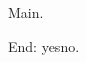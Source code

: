 \documentclass{article}
\begin{document}
Main.

End: \makeatletter\ifx\listfiles\@notprerr yes\else no\fi\makeatother.
\end{document}
